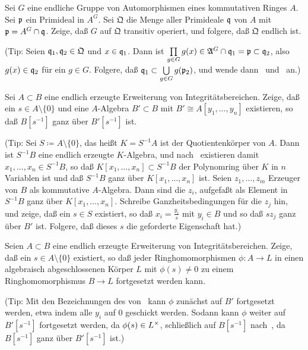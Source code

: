 \begin{exercise}
	Sei \(G\) eine endliche Gruppe von Automorphismen eines kommutativen Ringes
	\(A\). Sei \(\mathfrak{p}\) ein Primideal in \(A^G\). Sei \(\mathfrak Q\) die
	Menge aller Primideale \(\mathfrak{q}\) von \(A\) mit \(\mathfrak{p} = A^G \cap
	\mathfrak{q}\). Zeige, daß \(G\) auf \(\mathfrak Q\) transitiv operiert, und
	folgere, daß \(\mathfrak Q\) endlich ist.

	(Tip: Seien \(\mathfrak{q}_1, \mathfrak{q}_2 \in \mathfrak Q\) und \(x \in \mathfrak{q}_1\). Dann ist \(\prod\limits_{g \in G} g(x) \in \mathfrak{A}^G \cap \mathfrak{q}_1
	= \mathfrak{p} \subset \mathfrak{q}_2\), also \(g(x) \in \mathfrak{q}_2\) für ein
	\(g \in G\). Folgere, daß \(\mathfrak{q}_1 \subset \bigcup\limits_{g \in G}
	g(\mathfrak{p}_2)\), und wende dann~
	und~ an.)
\end{exercise}

\begin{exercise}
	\label{exer:global_noether_norm}
	Sei \(A \subset B\) eine endlich erzeugte Erweiterung von
	Integritätsbereichen. Zeige, daß ein \(s \in A \setminus \{0\}\) und eine
	\(A\)-Algebra \(B' \subset B\) mit \(B' \cong A[y_1, \dotsc, y_n]\)
	existieren, so daß \(B[s^{-1}]\) ganz über \(B'[s^{-1}]\) ist.
	
	(Tip: Sei \(S \coloneqq A \setminus \{0\}\), das heißt \(K = S^{-1} A\) ist
	der Quotientenkörper von \(A\). Dann ist \(S^{-1} B\) eine endlich erzeugte
	\(K\)-Algebra, und nach~ existieren damit
	\(x_1, \dotsc, x_n \in S^{-1} B\), so daß \(K[x_1, \dotsc, x_n] \subset
	S^{-1} B\) der Polynomring über \(K\) in \(n\) Variablen ist und daß
	\(S^{-1} B\) ganz über \(K[x_1, \dotsc, x_n]\) ist. Seien
	\(z_1, \dotsc, z_m\) Erzeuger von \(B\) als kommutative \(A\)-Algebra. Dann
	sind die \(z_i\), aufgefaßt als Element in \(S^{-1} B\) ganz über
	\(K[x_1, \dotsc, x_n]\). Schreibe Ganzheitsbedingungen für die \(z_j\) hin,
	und zeige, daß ein \(s \in S\) existiert, so daß \(x_i = \frac{y_i} s\)
	mit
	\(y_i \in B\) und so daß \(s z_j\) ganz über \(B'\) ist. Folgere, daß dieses
	\(s\) die geforderte Eigenschaft hat.)
\end{exercise}

\begin{exercise}
	\label{exer:global_extension_to_ac}
	Seien \(A \subset B\) eine endlich erzeugte Erweiterung von
	Integritätsbereichen. Zeige, daß ein \(s \in A \setminus \{0\}\) existiert,
	so daß jeder Ringhomomorphismen \(\phi\colon A \to L\) in einen algebraisch
	abgeschlossenen Körper \(L\) mit \(\phi(s) \neq 0\) zu einem
	Ringhomomorphismus \(B \to L\) fortgesetzt werden kann.
	
	(Tip: Mit den Bezeichnungen des
	von~ kann \(\phi\) zunächst auf
	\(B'\) fortgesetzt werden, etwa indem alle \(y_i\) auf \(0\) geschickt
	werden. Sodann kann \(\phi\) weiter auf \(B'[s^{-1}]\) fortgesetzt werden,
	da \(\phi(s) \in L^\times\), schließlich auf \(B[s^{-1}]\)
	nach~,
	da \(B[s^{-1}]\) ganz über \(B'[s^{-1}]\) ist.)
\end{exercise}

